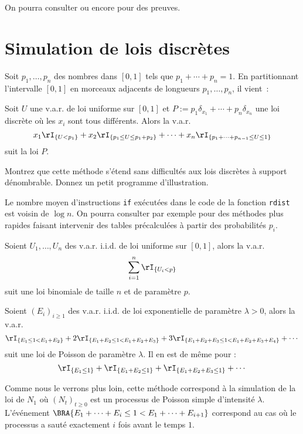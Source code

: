 On pourra consulter \cite[IV.4.3, p.79]{bouleau} ou encore \cite[VI.5.15, p. 180]{barbe-ledoux} pour des preuves.

%
\section{Simulation de lois discrètes}
%

Soit $p_1,\ldots,p_n$ des nombres dans $[0,1]$ tels que $p_1+\cdots+p_n=1$. En
partitionnant l'intervalle $[0,1]$ en morceaux adjacents de longueurs
$p_1,\ldots,p_n$, il vient~:


\begin{theorem}\label{th:simdiscr}
  Soit $U$ une v.a.r. de loi uniforme sur $[0,1]$ et $P:=p_1\delta_{x_1}+\cdots+p_n
  \delta_{x_n}$ une loi discrète où les $x_i$ sont tous différents. Alors la v.a.r.
  $$
  x_1 \rI_{\{U < p_1\}} 
  + x_2 \rI_{\{p_1\leq U \leq p_1+p_2\}} 
  + \cdots + x_n \rI_{\{p_1 + \cdots + p_{n-1} \leq U \leq 1\}}
  $$
  suit la loi $P$.
\end{theorem}

\begin{exo}
  Montrez que cette méthode s'étend sans difficultés aux lois discrètes à
  support dénombrable. Donnez un petit programme d'illustration.
\end{exo}

Le nombre moyen d'instructions \texttt{if} exécutées dans le code de la
fonction \texttt{rdist} est voisin de $\log n$. On pourra consulter par
exemple \cite{knuth-taocp-2-3} pour des méthodes plus rapides faisant
intervenir des tables précalculées à partir des probabilités $p_i$. 


\begin{theorem}
  Soient $U_1,\ldots,U_n$ des v.a.r. i.i.d. de loi uniforme sur $[0,1]$,
  alors la v.a.r. 
  $$
  \sum_{i=1}^n \rI_{\{U_i < p\}}
  $$
  suit une loi binomiale de taille $n$ et de paramètre $p$.
\end{theorem}

\begin{theorem}
  Soient $(E_i)_{i\geq 1}$ des v.a.r. i.i.d. de loi exponentielle de paramètre
  $\lambda >0$, alors la v.a.r.
  $$
  \rI_{\{E_1\leq 1 < E_1+E_2\}} 
  + 2 \rI_{\{E_1+E_2\leq 1 < E_1+E_2+E_3\}}
  + 3 \rI_{\{E_1+E_2+E_3\leq 1 < E_1+E_2+E_3+E_4\}}
  + \cdots
  $$
  suit une loi de Poisson de paramètre $\lambda$. Il en est de même pour :
  $$
  \rI_{\{E_1\leq 1\}} 
  + \rI_{\{E_1+E_2\leq 1\}}
  + \rI_{\{E_1+E_2+E_3\leq 1\}}
  + \cdots
  $$
\end{theorem}
Comme nous le verrons plus loin, cette méthode correspond à la simulation de
la loi de $N_1$ où $(N_t)_{t\geq 0}$ est un processus de Poisson simple
d'intensité $\lambda$. L'événement $\BRA{E_1+\cdots+E_i \leq 1 < E_1+\cdots+E_{i+1}}$ correspond
au cas où le processus a sauté exactement $i$ fois avant le temps $1$.

